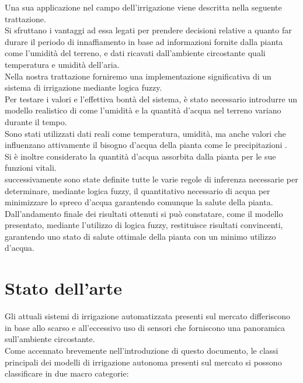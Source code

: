 \documentclass[conference,10pt]{IEEEtran}
\begin{document}
Una sua applicazione nel campo dell'irrigazione viene descritta nella seguente trattazione. \\ Si sfruttano i vantaggi ad essa legati per prendere decisioni relative a quanto far durare il periodo di innaffiamento in base ad informazioni fornite dalla pianta come l'umidità del terreno, e dati ricavati dall'ambiente circostante quali temperatura e umidità dell'aria.\\
Nella nostra trattazione forniremo una implementazione significativa di un sistema di irrigazione mediante logica fuzzy. \\
Per testare i valori e l'effettiva bontà del sistema, è stato necessario introdurre un modello realistico di come l'umidità e la quantità d'acqua nel terreno variano durante il tempo.\\
Sono stati utilizzati dati reali come temperatura, umidità, ma anche valori che influenzano attivamente il bisogno d'acqua della pianta come le precipitazioni \cite{7}.\\ Si è inoltre considerato la quantità d'acqua assorbita dalla pianta per le sue funzioni vitali.\\
successivamente sono state definite tutte le varie regole di inferenza necessarie per determinare, mediante logica fuzzy, il quantitativo necessario di acqua per minimizzare lo spreco d'acqua garantendo comunque la salute della pianta.\\
Dall'andamento finale dei risultati ottenuti si può constatare, come il modello presentato, mediante l'utilizzo di logica fuzzy, restituisce risultati convincenti, garantendo uno stato di salute ottimale della pianta con un minimo utilizzo d'acqua.

\section{Stato dell'arte}\label{sec:sota}
Gli attuali sistemi di irrigazione automatizzata presenti sul mercato differiscono in base allo scarso e all'eccessivo uso di sensori che forniscono una panoramica sull'ambiente circostante.\\
Come accennato brevemente nell'introduzione di questo documento, le classi principali dei modelli di irrigazione autonoma presenti sul mercato si possono classificare in due macro categorie:
\end{document}
